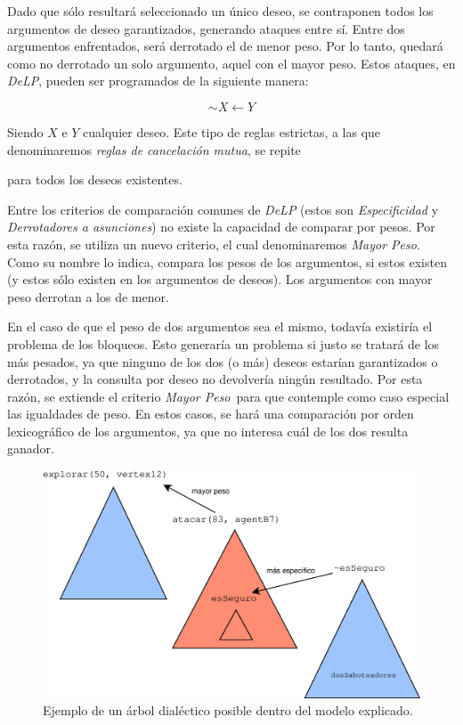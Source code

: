 \documentclass[oneside]{book}
\theoremstyle{definition}
\theoremstyle{example}
\begin{document}
Dado que sólo resultará seleccionado un único deseo, se contraponen todos los argumentos 
de deseo garantizados, generando ataques entre sí. Entre dos argumentos enfrentados, será
derrotado el de menor peso. Por lo tanto, quedará como no derrotado un solo argumento, 
aquel con el mayor peso. Estos ataques, en \textit{DeLP}, pueden ser programados de la 
siguiente manera:

$$ \sim X \leftarrow Y$$ 

Siendo $X$ e $Y$ cualquier deseo. Este tipo de reglas estrictas, a las que
denominaremos \textit{reglas de cancelación mutua}, se repite 

para todos los deseos existentes.

Entre los criterios de comparación comunes de \textit{DeLP} (estos son \textit{Especificidad} y 
\textit{Derrotadores a asunciones}) no existe la capacidad de comparar por pesos. 
Por esta razón, se utiliza un nuevo criterio, el cual 
denominaremos \textit{Mayor Peso}. Como su nombre lo indica, compara los pesos de los 
argumentos, si estos existen (y estos sólo existen en los argumentos de deseos). Los 
argumentos con mayor peso derrotan a los de menor.

En el caso de que el peso de dos argumentos sea el mismo, todavía existiría el problema 
de los bloqueos. Esto generaría un problema si justo se tratará de los más pesados, ya 
que ninguno de los dos (o más) deseos estarían garantizados o derrotados, y la consulta
por deseo no devolvería ningún resultado. Por esta razón, se extiende el criterio 
\textit{Mayor Peso}\ para que contemple como caso especial las igualdades de peso. En 
estos casos, se hará una comparación por orden lexicográfico de los argumentos, ya que
no interesa cuál de los dos resulta ganador. 

\begin{figure}
 \includegraphics[width=\textwidth]{mamarracho.eps}
 \caption{Ejemplo de un árbol dialéctico posible dentro del modelo explicado.}
 \label{fig:mamarracho}
\end{figure}
\end{document}

